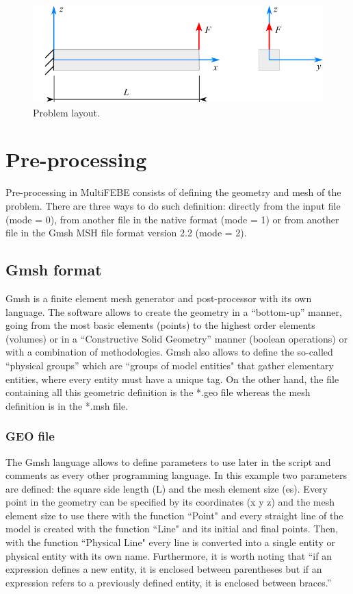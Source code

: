 \documentclass[a4]{article}
\begin{document}
\begin{figure}[h!]
	\centering
	\includegraphics{beam.pdf}
	\caption{Problem layout.}
	\label{fig:beam}
\end{figure}

\section{Pre-processing} 

Pre-processing in MultiFEBE consists of defining the geometry and mesh of the problem. There are three ways to do such definition: directly from the input file (mode = 0), from another file in the native format (mode = 1) or from another file in the Gmsh MSH file format version 2.2 (mode = 2).

\subsection{Gmsh format}

Gmsh \cite{gmsh, gmshweb} is a finite element mesh generator and post-processor with its own language. The software allows to create the geometry in a “bottom-up” manner, going from the most basic elements (points) to the highest order elements (volumes) or in a “Constructive Solid Geometry” manner (boolean operations) or with a combination of methodologies. Gmsh also allows to define the so-called “physical groups” which are ``groups of model entities" that gather elementary entities, where every entity must have a unique tag. On the other hand, the file containing all this geometric definition is the *.geo file whereas the mesh definition is in the *.msh file. 

\subsubsection{GEO file}

The Gmsh language allows to define parameters to use later in the script and comments as every other programming language. In this example two parameters are defined: the square side length (L) and the mesh element size (es). Every point in the geometry can be specified by its coordinates (x y z) and the mesh element size to use there with the function ``Point" and every straight line of the model is created with the function ``Line" and its initial and final points. Then, with the function ``Physical Line" every line is converted into a single entity or physical entity with its own name. Furthermore, it is worth noting that “if an expression defines a new entity, it is enclosed between parentheses but if an expression refers to a previously defined entity, it is enclosed between braces.” \cite{gmshweb} 
\end{document}
